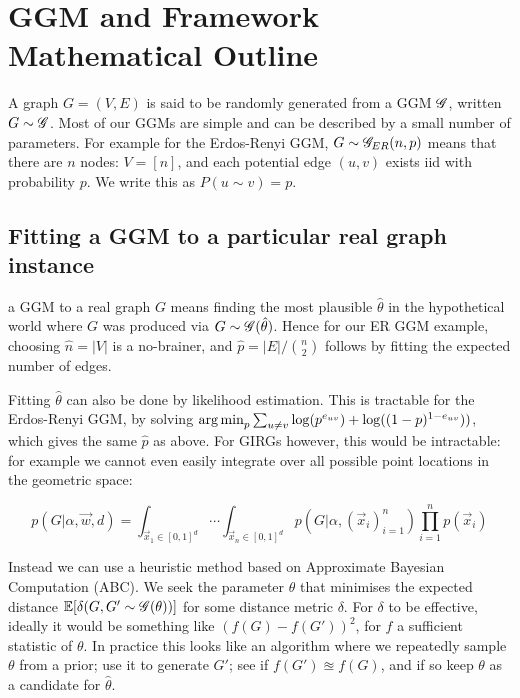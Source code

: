 

\section{GGM and Framework Mathematical Outline}
A graph $G = (V,E)$ is said to be randomly generated from a GGM $\mathscr{G}$, written $G \sim \mathscr{G}$. Most of our GGMs are simple and can be described by a small number of parameters. For example for the Erdos-Renyi GGM, $G \sim \mathscr{G}_{ER}(n, p)$ means that there are $n$ nodes: $V=[n]$, and each potential edge $(u,v)$ exists iid with probability $p$. We write this as $P(u \sim v) = p$.

\subsection{Fitting a GGM to a particular real graph instance}
\label{sec:fitting_GGM}
 a GGM to a real graph $G$ means finding the most plausible $\hat{\theta}$ in the hypothetical world where $G$ was produced via $G \sim \mathscr{G}(\hat{\theta})$. Hence for our ER GGM example, choosing $\hat{n} = |V|$ is a no-brainer, and $\hat{p} = |E| / \binom{n}{2}$ follows by fitting the expected number of edges.

Fitting $\hat{\theta}$ can also be done by likelihood estimation. This is tractable for the Erdos-Renyi GGM, by solving $\operatorname*{arg\,min}_p \sum_{u \neq v} \log(p^{e_{uv}}) + \log((1-p)^{1 - e_{uv}}))$, which gives the same $\hat{p}$ as above. For GIRGs however, this would be intractable: for example we cannot even easily integrate over all possible point locations in the geometric space:

\begin{equation*}
    p(G | \alpha, \vec{w}, d) = \int_{\vec{x}_1 \in [0,1]^d} \cdots \int_{\vec{x}_n \in [0,1]^d} p(G | \alpha, (\vec{x}_i)_{i=1}^n) \prod_{i=1}^n p(\vec{x}_i)
\end{equation*}

Instead we can use a heuristic method based on Approximate Bayesian Computation (ABC). We seek the parameter $\hat{\theta}$ that minimises the expected distance $ \mathbb{E}[\delta(G, G' \sim \mathscr{G}(\theta))]$ for some distance metric $\delta$. For $\delta$ to be effective, ideally it would be something like $(f(G) - f(G'))^2$, for $f$ a sufficient statistic of $\theta$. In practice this looks like an algorithm where we repeatedly sample $\theta$ from a prior; use it to generate $G'$; see if $f(G') \approxeq f(G)$, and if so keep $\theta$ as a candidate for $\hat{\theta}$.

